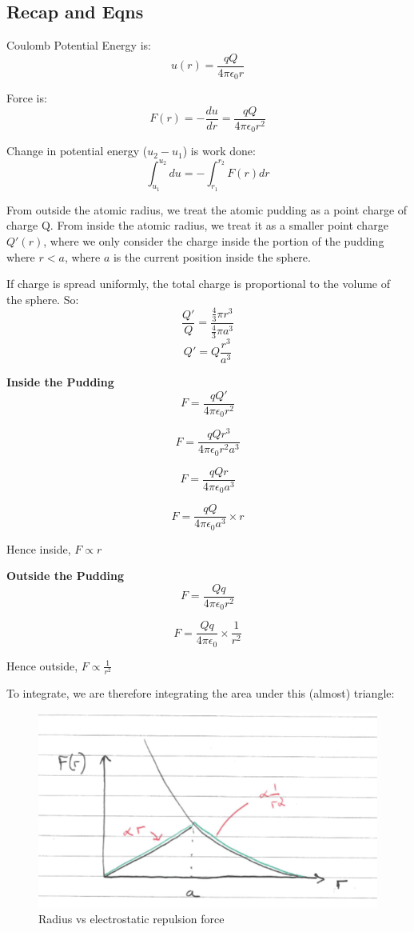 \subsection*{Recap and Eqns}
 
Coulomb Potential Energy is:
\[
    u(r) = \frac{qQ}{4 \pi \epsilon_0 r}
\]

Force is:
\[
    F(r) = -\frac{du}{dr} = \frac{qQ}{4 \pi \epsilon_0 r^2}
\]

Change in potential energy ($u_2 - u_1$) is work done:
\[
    \int_{u_1}^{u_2} du = -\int_{r_1}^{r_2} F(r) dr
\]

From outside the atomic radius, we treat the atomic pudding as a point charge of charge Q.
From inside the atomic radius, we treat it as a smaller point charge $Q'(r)$, where we only consider the charge inside the portion of the pudding where $r<a$, where $a$ is the current position inside the sphere.

If charge is spread uniformly, the total charge is proportional to the volume of the sphere. So:
\[
    \frac{Q'}{Q} = \frac{\frac{4}{3} \pi r^3}{\frac{4}{3} \pi a^3}
\]
\[
    Q' = Q\frac{r^3}{a^3}
\]

\textbf{Inside the Pudding}
\[
    F = \frac{qQ'}{4 \pi \epsilon_0 r^2}
\]

\[
    F = \frac{qQr^3}{4 \pi \epsilon_0 r^2 a^3}
\]

\[
    F = \frac{qQr}{4 \pi \epsilon_0 a^3}
\]

\[
    F = \frac{qQ}{4 \pi \epsilon_0 a^3} \times r
\]


Hence inside, $F \propto r$

\textbf{Outside the Pudding}
\[
    F = \frac{Qq}{4 \pi \epsilon_0 r^2}
\]

\[
    F = \frac{Qq}{4 \pi \epsilon_0} \times \frac{1}{r^2}
\]


Hence outside, $F \propto \frac{1}{r^2}$

To integrate, we are therefore integrating the area under this (almost) triangle:
\begin{figure}[H]
    \centering
    \includegraphics{figures/lec01-03.png}
     \caption{Radius vs electrostatic repulsion force }
\end{figure}


